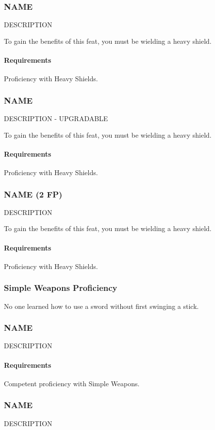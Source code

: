\subsubsection{NAME} \label{feat::name}
    DESCRIPTION

    To gain the benefits of this feat, you must be wielding a heavy shield.
    \paragraph{Requirements} Proficiency with Heavy Shields.
\subsubsection{NAME} \label{feat::name}
    DESCRIPTION - UPGRADABLE

    To gain the benefits of this feat, you must be wielding a heavy shield.
    \paragraph{Requirements} Proficiency with Heavy Shields.
\subsubsection{NAME (2 FP)} \label{feat::name}
    DESCRIPTION

    To gain the benefits of this feat, you must be wielding a heavy shield.
    \paragraph{Requirements} Proficiency with Heavy Shields.

\subsubsection{Simple Weapons Proficiency} \label{feat::name}
    No one learned how to use a sword without first swinging a stick.
\subsubsection{NAME} \label{feat::name}
    DESCRIPTION
    \paragraph{Requirements} Competent proficiency with Simple Weapons.
\subsubsection{NAME} \label{feat::name}
    DESCRIPTION
